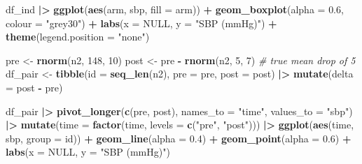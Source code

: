 \documentclass[
]{article}
\newenvironment{Shaded}{\begin{snugshade}}{\end{snugshade}}
\newcommand{\AttributeTok}[1]{\textcolor[rgb]{0.13,0.29,0.53}{#1}}
\newcommand{\CommentTok}[1]{\textcolor[rgb]{0.56,0.35,0.01}{\textit{#1}}}
\newcommand{\ConstantTok}[1]{\textcolor[rgb]{0.56,0.35,0.01}{#1}}
\newcommand{\DecValTok}[1]{\textcolor[rgb]{0.00,0.00,0.81}{#1}}
\newcommand{\FloatTok}[1]{\textcolor[rgb]{0.00,0.00,0.81}{#1}}
\newcommand{\FunctionTok}[1]{\textcolor[rgb]{0.13,0.29,0.53}{\textbf{#1}}}
\newcommand{\NormalTok}[1]{#1}
\newcommand{\OtherTok}[1]{\textcolor[rgb]{0.56,0.35,0.01}{#1}}
\newcommand{\SpecialCharTok}[1]{\textcolor[rgb]{0.81,0.36,0.00}{\textbf{#1}}}
\newcommand{\StringTok}[1]{\textcolor[rgb]{0.31,0.60,0.02}{#1}}
\begin{document}
\begin{Shaded}
\begin{Highlighting}[]
\NormalTok{df\_ind }\SpecialCharTok{|\textgreater{}}
  \FunctionTok{ggplot}\NormalTok{(}\FunctionTok{aes}\NormalTok{(arm, sbp, }\AttributeTok{fill =}\NormalTok{ arm)) }\SpecialCharTok{+}
  \FunctionTok{geom\_boxplot}\NormalTok{(}\AttributeTok{alpha =} \FloatTok{0.6}\NormalTok{, }\AttributeTok{colour =} \StringTok{"grey30"}\NormalTok{) }\SpecialCharTok{+}
  \FunctionTok{labs}\NormalTok{(}\AttributeTok{x =} \ConstantTok{NULL}\NormalTok{, }\AttributeTok{y =} \StringTok{"SBP (mmHg)"}\NormalTok{) }\SpecialCharTok{+}
  \FunctionTok{theme}\NormalTok{(}\AttributeTok{legend.position =} \StringTok{"none"}\NormalTok{)}
\end{Highlighting}
\end{Shaded}

\begin{Shaded}
\begin{Highlighting}[]
\NormalTok{pre  }\OtherTok{\textless{}{-}} \FunctionTok{rnorm}\NormalTok{(n2, }\DecValTok{148}\NormalTok{, }\DecValTok{10}\NormalTok{)}
\NormalTok{post }\OtherTok{\textless{}{-}}\NormalTok{ pre }\SpecialCharTok{{-}} \FunctionTok{rnorm}\NormalTok{(n2, }\DecValTok{5}\NormalTok{, }\DecValTok{7}\NormalTok{)  }\CommentTok{\# true mean drop of 5}
\NormalTok{df\_pair }\OtherTok{\textless{}{-}} \FunctionTok{tibble}\NormalTok{(}\AttributeTok{id =} \FunctionTok{seq\_len}\NormalTok{(n2), }\AttributeTok{pre =}\NormalTok{ pre, }\AttributeTok{post =}\NormalTok{ post) }\SpecialCharTok{|\textgreater{}}
  \FunctionTok{mutate}\NormalTok{(}\AttributeTok{delta =}\NormalTok{ post }\SpecialCharTok{{-}}\NormalTok{ pre)}
\end{Highlighting}
\end{Shaded}

\begin{Shaded}
\begin{Highlighting}[]
\NormalTok{df\_pair }\SpecialCharTok{|\textgreater{}}
  \FunctionTok{pivot\_longer}\NormalTok{(}\FunctionTok{c}\NormalTok{(pre, post), }\AttributeTok{names\_to =} \StringTok{"time"}\NormalTok{, }\AttributeTok{values\_to =} \StringTok{"sbp"}\NormalTok{) }\SpecialCharTok{|\textgreater{}}
  \FunctionTok{mutate}\NormalTok{(}\AttributeTok{time =} \FunctionTok{factor}\NormalTok{(time, }\AttributeTok{levels =} \FunctionTok{c}\NormalTok{(}\StringTok{"pre"}\NormalTok{, }\StringTok{"post"}\NormalTok{))) }\SpecialCharTok{|\textgreater{}}
  \FunctionTok{ggplot}\NormalTok{(}\FunctionTok{aes}\NormalTok{(time, sbp, }\AttributeTok{group =}\NormalTok{ id)) }\SpecialCharTok{+}
  \FunctionTok{geom\_line}\NormalTok{(}\AttributeTok{alpha =} \FloatTok{0.4}\NormalTok{) }\SpecialCharTok{+}
  \FunctionTok{geom\_point}\NormalTok{(}\AttributeTok{alpha =} \FloatTok{0.6}\NormalTok{) }\SpecialCharTok{+}
  \FunctionTok{labs}\NormalTok{(}\AttributeTok{x =} \ConstantTok{NULL}\NormalTok{, }\AttributeTok{y =} \StringTok{"SBP (mmHg)"}\NormalTok{)}
\end{Highlighting}
\end{Shaded}
\end{document}
